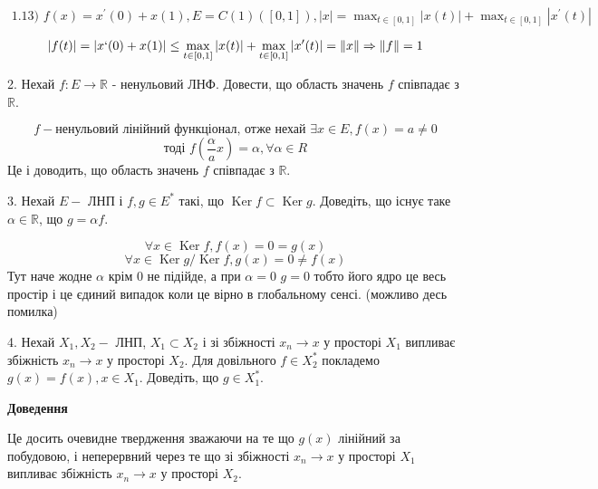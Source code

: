 \begin{tcolorbox}
    $
    \text { 1.13) } f(x)=x^{\prime}(0)+x(1), E=C(1)([0,1]),|x|=\max _{t \in[0,1]}|x(t)|+\max _{t \in[0,1]}|x^{\prime}(t)|
    $

    $$|f(t)| = |x`(0) + x(1)| \le \max _{t \in[0,1]}|x(t)|+\max _{t \in[0,1]}|x^{\prime}(t)|=
    \|x\| \Rightarrow \|f\| = 1 $$


\end{tcolorbox}

\begin{tcolorbox}[title=Завдання 2]
    2. Нехай $f: E \rightarrow \mathbb{R}$ - ненульовий ЛНФ. Довести, що область значень $f$ співпадає з $\mathbb{R}$.

    $$f - \text{ненульовий лінійний функціонал, отже нехай } \exists x \in E, f(x) = a \neq 0$$
    $$ \text{тоді } f(\frac{\alpha}{a} x) = \alpha , \forall \alpha \in R$$
    Це і доводить, що область значень $f$ співпадає з $\mathbb{R}$.
\end{tcolorbox}

\begin{tcolorbox}[title=Завдання 3]
    3. Нехай $E-$ ЛНП і $f, g \in E^{*}$ такі, 
    що $\operatorname{Ker} f \subset \operatorname{Ker} g$. 
    Доведіть, що існує таке $\alpha \in \mathbb{R}$, що $g=\alpha f$.

    $$ \forall x \in \operatorname{Ker} f, f(x) = 0 = g(x)$$
    $$ \forall x \in \operatorname{Ker} g / \operatorname{Ker} f, g(x) = 0 \neq f(x)$$
    Тут наче жодне $\alpha$ крім 0 не підійде, а при $\alpha = 0$ $g = 0$ тобто його ядро 
    це весь простір і це єдиний випадок коли це вірно в глобальному сенсі.
    (можливо десь помилка)
\end{tcolorbox}


\begin{tcolorbox}[title=Завдання 4]
    4. Нехай $X_{1}, X_{2}-$ ЛНП, $X_{1} \subset X_{2}$ і зі збіжності $x_{n} \rightarrow 
    x$ у просторі $X_{1}$ випливає збіжність $x_{n} \rightarrow x$ у просторі $X_{2}$. 
    Для довільного $f \in X_{2}^{*}$ покладемо $g(x)=f(x), x \in X_{1}$. 
    Доведіть, що $g \in X_{1}^{*}$.

    \begin{center}
        \textbf{Доведення}
    \end{center}

    Це досить очевидне твердження зважаючи на те що $g(x)$ лінійний за побудовою,
    і неперервний через те що зі збіжності $x_{n} \rightarrow x$ у просторі $X_{1}$ випливає збіжність $x_{n} \rightarrow x$ у просторі $X_{2}$.
\end{tcolorbox}